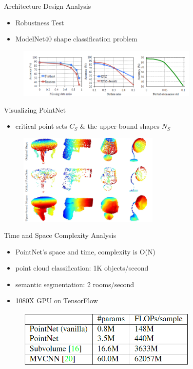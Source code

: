 \documentclass[serif,mathserif]{beamer}
\begin{document}
\begin{frame}{Architecture Design Analysis}
	\begin{itemize}
		\item Robustness Test
		\item ModelNet40 shape classification problem
	\end{itemize}
	\begin{figure}
		\includegraphics[width=9cm]{image/arch3.png}
	\end{figure}
\end{frame}

\begin{frame}{Visualizing PointNet}
	\begin{itemize}
		\item critical point sets $ C_S $ \& the upper-bound shapes $ N_S $
	\end{itemize}
	
	\begin{figure}
		\includegraphics[width=7cm]{image/visual.png}
	\end{figure}
\end{frame}

\begin{frame}{Time and Space Complexity Analysis}
	\begin{itemize}
		\item PointNet’s space and time, complexity is O(N)
		\item point cloud classification: 1K objects/second
		\item semantic segmentation: 2 rooms/second
		\item 1080X GPU on TensorFlow
	\end{itemize}
	\begin{figure}
		\includegraphics[width=9cm]{image/time.png}
	\end{figure}
\end{frame}
\end{document}
